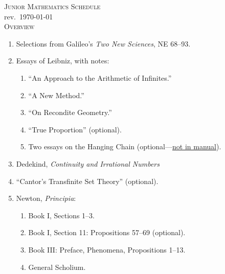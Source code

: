 \documentclass[10pt]{article}
\begin{document}

\begin{center}
  \textsc{Junior Mathematics Schedule}\\[5pt]
  \footnotesize{rev.~\today}\\[30pt]
  \textsc{\small{Overview}}
\end{center}

\bigskip

\begin{enumerate}[noitemsep]
  \item Selections from Galileo's \emph{Two New Sciences}, NE 68--93.%
  \item Essays of Leibniz, with notes:
    \begin{enumerate}
      \item ``An Approach to the Arithmetic of Infinites.''
      \item ``A New Method.''
      \item ``On Recondite Geometry.''
      \item ``True Proportion'' (optional).
      \item Two essays on the Hanging Chain (optional---\href{https://drive.google.com/file/d/1Q06ypQH26GPMVsxn8SRQVEEn79qmUxOE/view?usp=sharing}{not in manual}).
\end{enumerate}
  \item Dedekind, \emph{Continuity and Irrational Numbers}
  \item ``Cantor's Transfinite Set Theory'' (optional).
  \item Newton, \emph{Principia}:
    \begin{enumerate}
      \item Book I, Sections 1--3.
      \item Book I, Section 11: Propositions 57--69 (optional).
      \item Book III: Preface, Phenomena, Propositions 1--13.
      \item General Scholium.
    \end{enumerate}
\end{enumerate}
\end{document}
